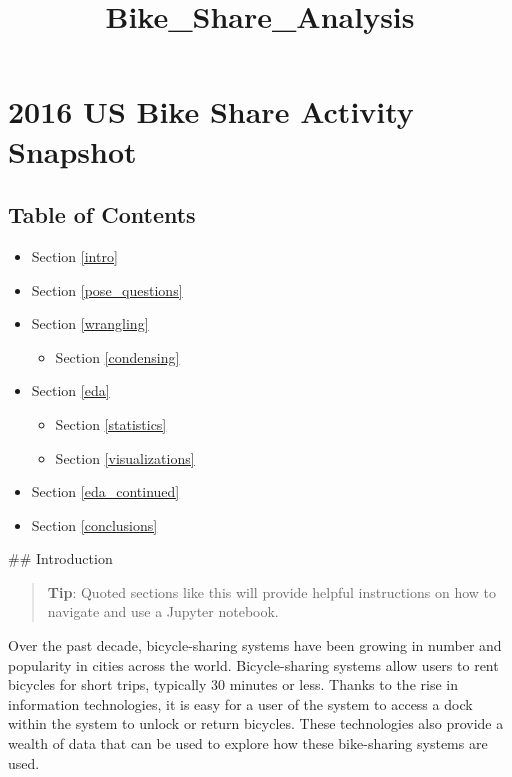 \documentclass[11pt]{article}
\title{Bike\_Share\_Analysis}
\providecommand{\tightlist}{%
      \setlength{\itemsep}{0pt}\setlength{\parskip}{0pt}}
\begin{document}
    
    
    \maketitle
    
    

    
    \hypertarget{us-bike-share-activity-snapshot}{%
\section{2016 US Bike Share Activity
Snapshot}\label{us-bike-share-activity-snapshot}}

\hypertarget{table-of-contents}{%
\subsection{Table of Contents}\label{table-of-contents}}

\begin{itemize}
\tightlist
\item
  Section \ref{intro}
\item
  Section \ref{pose_questions}
\item
  Section \ref{wrangling}

  \begin{itemize}
  \tightlist
  \item
    Section \ref{condensing}
  \end{itemize}
\item
  Section \ref{eda}

  \begin{itemize}
  \tightlist
  \item
    Section \ref{statistics}
  \item
    Section \ref{visualizations}
  \end{itemize}
\item
  Section \ref{eda_continued}
\item
  Section \ref{conclusions}
\end{itemize}

 \#\# Introduction

\begin{quote}
\textbf{Tip}: Quoted sections like this will provide helpful
instructions on how to navigate and use a Jupyter notebook.
\end{quote}

Over the past decade, bicycle-sharing systems have been growing in
number and popularity in cities across the world. Bicycle-sharing
systems allow users to rent bicycles for short trips, typically 30
minutes or less. Thanks to the rise in information technologies, it is
easy for a user of the system to access a dock within the system to
unlock or return bicycles. These technologies also provide a wealth of
data that can be used to explore how these bike-sharing systems are
used.
\end{document}
